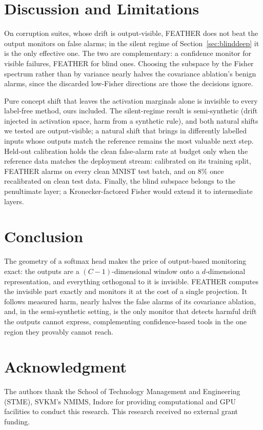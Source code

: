 \documentclass[conference]{IEEEtran}
\begin{document}
\section{Discussion and Limitations}
\label{sec:limitations}

On corruption suites, whose drift is output-visible, FEATHER does not beat the
output monitors on false alarms; in the silent regime of
Section~\ref{sec:blinddeep} it is the only effective one. The two are
complementary: a confidence monitor for visible failures, FEATHER for blind
ones. Choosing the subspace by the Fisher spectrum rather than by variance
nearly halves the covariance ablation's benign alarms, since the discarded
low-Fisher directions are those the decisions ignore.

Pure concept shift that leaves the activation marginals alone is invisible to
every label-free method, ours included. The silent-regime result is
semi-synthetic (drift injected in activation space, harm from a synthetic
rule), and both natural shifts we tested are output-visible; a natural shift
that brings in differently labelled inputs whose outputs match the reference
remains the most valuable next step. Held-out calibration holds the clean
false-alarm rate at budget only when the reference data matches the deployment
stream: calibrated on its training split, FEATHER alarms on every clean MNIST
test batch, and on $8\%$ once recalibrated on clean test data. Finally, the
blind subspace belongs to the penultimate layer; a Kronecker-factored Fisher
\cite{martens2015kfac} would extend it to intermediate layers.

\section{Conclusion}
\label{sec:conclusion}

The geometry of a softmax head makes the price of output-based monitoring
exact: the outputs are a $(C-1)$-dimensional window onto a $d$-dimensional
representation, and everything orthogonal to it is invisible. FEATHER computes
the invisible part exactly and monitors it at the cost of a single projection.
It follows measured harm, nearly halves the false alarms of its covariance
ablation, and, in the semi-synthetic setting, is the only monitor that detects
harmful drift the outputs cannot express, complementing confidence-based tools
in the one region they provably cannot reach.

\section*{Acknowledgment}
The authors thank the School of Technology Management and Engineering
(STME), SVKM's NMIMS, Indore for providing computational and GPU facilities
to conduct this research. This research received no external grant funding.



\end{document}
